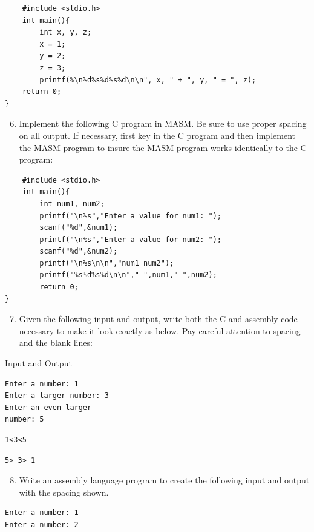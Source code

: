 \documentclass[10pt]{book}
\begin{document}
\begin{verbatim}
    #include <stdio.h>
    int main(){
        int x, y, z;
        x = 1;
        y = 2;
        z = 3;
        printf(%\n%d%s%d%s%d\n\n", x, " + ", y, " = ", z);
    return 0;
}
\end{verbatim}

\begin{enumerate}
  \setcounter{enumi}{5}
  \item Implement the following C program in MASM. Be sure to use proper spacing on all output. If necessary, first key in the C program and then implement the MASM program to insure the MASM program works identically to the C program:
\end{enumerate}

\begin{verbatim}
    #include <stdio.h>
    int main(){
        int num1, num2;
        printf("\n%s","Enter a value for num1: ");
        scanf("%d",&num1);
        printf("\n%s","Enter a value for num2: ");
        scanf("%d",&num2);
        printf("\n%s\n\n","num1 num2");
        printf("%s%d%s%d\n\n"," ",num1," ",num2);
        return 0;
}
\end{verbatim}

\begin{enumerate}
  \setcounter{enumi}{6}
  \item Given the following input and output, write both the C and assembly code necessary to make it look exactly as below. Pay careful attention to spacing and the blank lines:
\end{enumerate}

Input and Output
\begin{verbatim}
Enter a number: 1
Enter a larger number: 3
Enter an even larger
number: 5
\end{verbatim}

\begin{verbatim}
1<3<5
\end{verbatim}

\begin{verbatim}
5> 3> 1
\end{verbatim}

\begin{enumerate}
  \setcounter{enumi}{7}
  \item Write an assembly language program to create the following input and output with the spacing shown.
\end{enumerate}

\begin{verbatim}
Enter a number: 1
Enter a number: 2
\end{verbatim}
\end{document}
